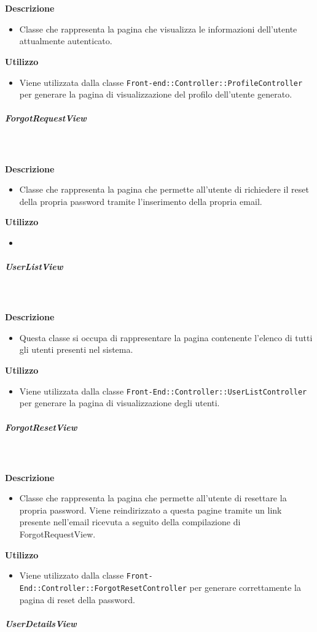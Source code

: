 				\textbf{\\ \\ Descrizione} 
					\begin{itemize}
						\item[] Classe che rappresenta la pagina che visualizza le informazioni dell'utente attualmente autenticato.
					\end{itemize}      
				\textbf{Utilizzo}  
					\begin{itemize}
						\item[] Viene utilizzata dalla classe \texttt{Front-end::Controller::ProfileController} per generare la pagina di visualizzazione del profilo dell'utente generato.
					\end{itemize}
			\subparagraph{ForgotRequestView}
				
				\textbf{\\ \\ Descrizione} 
					\begin{itemize}
						\item[] Classe che rappresenta la pagina che permette all'utente di richiedere il reset della propria password tramite l'inserimento della propria email.
					\end{itemize}      
				\textbf{Utilizzo}  
					\begin{itemize}
						\item[] 
					\end{itemize}
			\subparagraph{UserListView}
				
				\textbf{\\ \\ Descrizione} 
					\begin{itemize}
						\item[] Questa classe si occupa di rappresentare la pagina contenente l'elenco di tutti gli utenti presenti nel sistema.
					\end{itemize}      
				\textbf{Utilizzo}  
					\begin{itemize}
						\item[] Viene utilizzata dalla classe \texttt{Front-End::Controller::UserListController} per generare la pagina di visualizzazione degli utenti.
					\end{itemize}
			\subparagraph{ForgotResetView}
				
				\textbf{\\ \\ Descrizione} 
					\begin{itemize}
						\item[] Classe che rappresenta la pagina che permette all'utente di resettare la propria password. Viene reindirizzato a questa pagine tramite un link presente nell'email ricevuta a seguito della compilazione di ForgotRequestView.
					\end{itemize}      
				\textbf{Utilizzo}  
					\begin{itemize}
						\item[] Viene utilizzato dalla classe \texttt{Front-End::Controller::ForgotResetController} per generare correttamente la pagina di reset della password.
					\end{itemize}
			\subparagraph{UserDetailsView}
				
